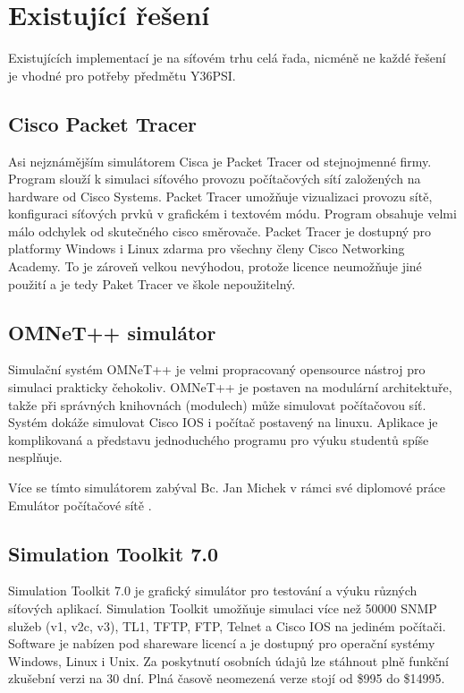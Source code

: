 \chapter{Existující řešení}
Existujících implementací je na síťovém trhu celá řada, nicméně ne každé řešení je vhodné pro potřeby předmětu Y36PSI.

\section{Cisco Packet Tracer}
Asi nejznámějším simulátorem Cisca je Packet Tracer \cite{cisco:pt} od stejnojmenné firmy. Program slouží k simulaci síťového provozu počítačových sítí založených na hardware od Cisco Systems. Packet Tracer umožňuje vizualizaci provozu sítě, konfiguraci síťových prvků v grafickém i textovém módu. Program obsahuje velmi málo odchylek od skutečného cisco směrovače. Packet Tracer je dostupný pro platformy Windows i Linux zdarma pro všechny členy Cisco Networking Academy. To je zároveň velkou nevýhodou, protože licence neumožňuje jiné použití a je tedy Paket Tracer ve škole nepoužitelný.


\section{OMNeT++ simulátor} 
Simulační systém OMNeT++ \cite{reserse:omnet_hp} je velmi propracovaný opensource nástroj pro simulaci prakticky čehokoliv. OMNeT++ je postaven na modulární architektuře, takže při správných knihovnách (modulech) může simulovat počítačovou síť. Systém dokáže simulovat Cisco IOS i počítač postavený na linuxu. Aplikace je komplikovaná a představu jednoduchého programu pro výuku studentů spíše nesplňuje.

Více se tímto simulátorem zabýval Bc. Jan Michek v rámci své diplomové práce Emulátor počítačové sítě \cite{reserse:omnet_dp}.


\section{Simulation Toolkit 7.0} 
Simulation Toolkit 7.0 \cite{reserse:adventnet} je grafický simulátor pro testování a výuku různých síťových aplikací. Simulation Toolkit umožňuje simulaci více než 50000 SNMP služeb (v1, v2c, v3), TL1, TFTP, FTP, Telnet a Cisco IOS na jediném počítači. Software je nabízen pod shareware licencí a je dostupný pro operační systémy Windows, Linux i Unix. Za poskytnutí osobních údajů lze stáhnout plně funkční zkušební verzi na 30 dní. Plná časově neomezená verze stojí od \$995 do \$14995.


